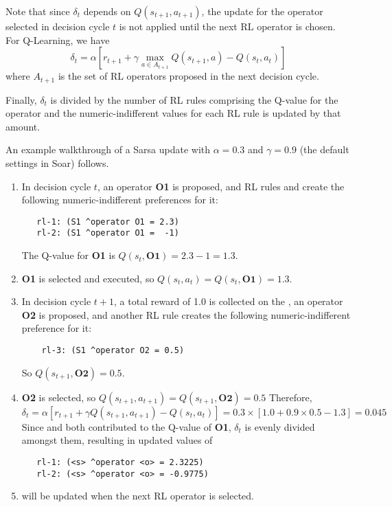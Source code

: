Note that since $\delta_t$ depends on $Q(s_{t+1}, a_{t+1})$, the update for the operator selected in decision cycle $t$ is not applied until the next RL operator is chosen.
For Q-Learning, we have
$$ \delta_t = \alpha \left[ r_{t+1} + \gamma \underset{a \in A_{t+1}}{\max} Q(s_{t+1}, a) - Q(s_t, a_t) \right] $$
where $A_{t+1}$ is the set of RL operators proposed in the next decision cycle.

Finally, $\delta_t$ is divided by the number of RL rules comprising the Q-value for the operator and the numeric-indifferent values for each RL rule is updated by that amount.

An example walkthrough of a Sarsa update with $\alpha = 0.3$ and $\gamma = 0.9$ (the default settings in Soar) follows.

\begin{enumerate}

\item In decision cycle $t$, an operator \textbf{O1} is proposed, and RL rules  and  create the following numeric-indifferent preferences for it:
\begin{verbatim}
   rl-1: (S1 ^operator O1 = 2.3)
   rl-2: (S1 ^operator O1 =  -1)
\end{verbatim}
	The Q-value for \textbf{O1} is $Q(s_t, \textbf{O1}) = 2.3 - 1 = 1.3$.

\item \textbf{O1} is selected and executed, so $Q(s_t, a_t) = Q(s_t, \textbf{O1}) = 1.3$.

\item In decision cycle $t+1$, a total reward of 1.0 is collected on the , an operator \textbf{O2} is proposed, and another RL rule  creates the following numeric-indifferent preference for it:
\begin{verbatim}
	rl-3: (S1 ^operator O2 = 0.5)
\end{verbatim}
	So $Q(s_{t+1}, \textbf{O2}) = 0.5$.

\item \textbf{O2} is selected, so $Q(s_{t+1}, a_{t+1}) = Q(s_{t+1}, \textbf{O2}) = 0.5$
	Therefore,
	$$\delta_t = \alpha \left[r_{t+1} + \gamma Q(s_{t+1}, a_{t+1}) - Q(s_t, a_t) \right] = 0.3 \times [ 1.0 + 0.9 \times 0.5 - 1.3 ] = 0.045$$
	Since  and  both contributed to the Q-value of \textbf{O1}, $\delta_t$ is evenly divided amongst them, resulting in updated values of
\begin{verbatim}
   rl-1: (<s> ^operator <o> = 2.3225)
   rl-2: (<s> ^operator <o> = -0.9775)
\end{verbatim}

\item {} will be updated when the next RL operator is selected.
\end{enumerate}

